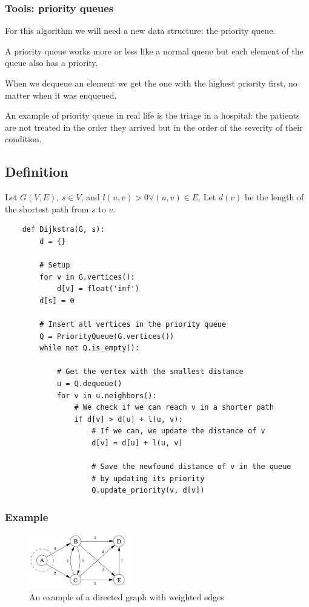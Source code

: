 \documentclass[12pt]{extarticle}
\begin{document}
\subsubsection{Tools: priority queues}

For this algorithm we will need a new data structure: the priority queue.

A priority queue works more or less like a normal queue but each element of the queue also has a priority.

When we dequeue an element we get the one with the highest priority first, no matter when it was enqueued.

An example of priority queue in real life is the triage in a hospital: the patients are not treated in the order they arrived but in the order of the severity of their condition.

\subsection{Definition}

Let $G(V, E)$, $s \in V$, and $l(u, v) > 0 \forall (u, v) \in E$. Let $d(v)$ be the length of the shortest path from $s$ to $v$.

\begin{verbatim}
    def Dijkstra(G, s):
        d = {}

        # Setup
        for v in G.vertices():
            d[v] = float('inf')
        d[s] = 0

        # Insert all vertices in the priority queue
        Q = PriorityQueue(G.vertices())
        while not Q.is_empty():

            # Get the vertex with the smallest distance
            u = Q.dequeue()
            for v in u.neighbors():
                # We check if we can reach v in a shorter path
                if d[v] > d[u] + l(u, v):
                    # If we can, we update the distance of v
                    d[v] = d[u] + l(u, v)

                    # Save the newfound distance of v in the queue
                    # by updating its priority
                    Q.update_priority(v, d[v])
\end{verbatim}

\subsubsection{Example}

\begin{figure}[H]
    \centering
    \includegraphics[width=0.4\textwidth]{assets/S2_P1_CS2/dijsktra.png}

    \caption{An example of a directed graph with weighted edges}
    \label{fig:weighted_directedgraph}
\end{figure}
\end{document}

